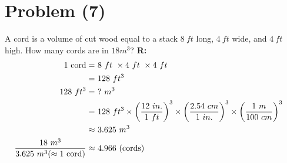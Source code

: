\section{Problem (7)}
	A cord is a volume of cut wood equal to a stack $8 \ ft$ long, $4 \ ft$ wide, and $4 \ ft$ high. How many cords are in $18 m^{3}$? \newline
	\textbf{R:} \newline
	\begin{align}
		1 \ \text{cord} = \ & 8 \ ft \ \times 4 \ ft \ \times 4 \ ft& \notag \\
		= \ & 128 \ ft^{3} & \\
		128 \ ft^{3} = \ & ? \ m^{3} & \notag \\
		= \ & 128 \ ft^{3}
		\times \left( \frac{12 \ in.}{1 \ ft} \right)^{3}
		\times \left( \frac{2.54 \ cm}{1 \ in.} \right)^{3}
		\times \left( \frac{1 \ m}{100 \ cm} \right)^{3}& \notag \\
		\approx \ & 3.625 \ m^{3}& \\
		\frac{18 \ m^{3}}{3.625 \ m^{3} (\approx 1 \ \text{cord})}
		\approx \ & 4.966 \ (\text{cords})&
	\end{align}
